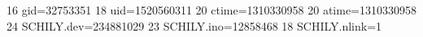 16 gid=32753351
18 uid=1520560311
20 ctime=1310330958
20 atime=1310330958
24 SCHILY.dev=234881029
23 SCHILY.ino=12858468
18 SCHILY.nlink=1
